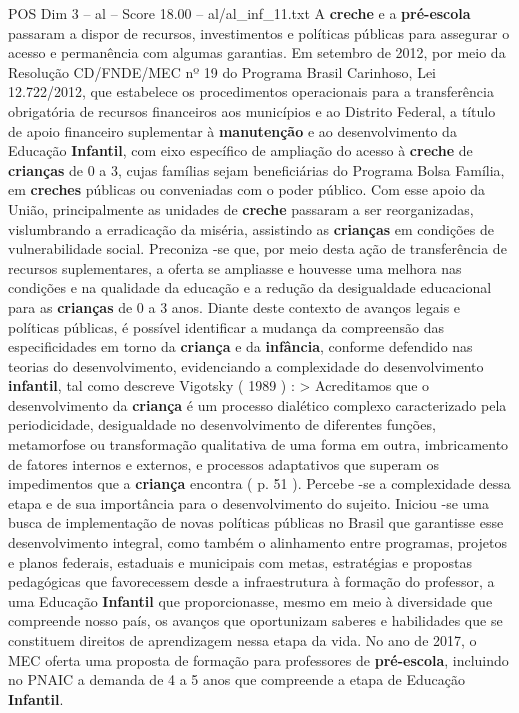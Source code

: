 \begin{textsample}{POS Dim 3 – al – Score 18.00 – al/al\_inf\_11.txt}
A \textbf{creche} e a \textbf{pré-escola} passaram a dispor de recursos, investimentos e políticas públicas para assegurar o acesso e permanência com algumas garantias.
Em setembro de 2012, por meio da Resolução CD/FNDE/MEC nº 19 do Programa Brasil Carinhoso, Lei 12.722/2012, que estabelece os procedimentos operacionais para a transferência obrigatória de recursos financeiros aos municípios e ao Distrito Federal, a título de apoio financeiro suplementar à \textbf{manutenção} e ao desenvolvimento da Educação \textbf{Infantil}, com eixo específico de ampliação do acesso à \textbf{creche} de \textbf{crianças} de 0 a 3, cujas famílias sejam beneficiárias do Programa Bolsa Família, em \textbf{creches} públicas ou conveniadas com o poder público.
Com esse apoio da União, principalmente as unidades de \textbf{creche} passaram a ser reorganizadas, vislumbrando a erradicação da miséria, assistindo as \textbf{crianças} em condições de vulnerabilidade social.
Preconiza -se que, por meio desta ação de transferência de recursos suplementares, a oferta se ampliasse e houvesse uma melhora nas condições e na qualidade da educação e a redução da desigualdade educacional para as \textbf{crianças} de 0 a 3 anos.
Diante deste contexto de avanços legais e políticas públicas, é possível identificar a mudança da compreensão das especificidades em torno da \textbf{criança} e da \textbf{infância}, conforme defendido nas teorias do desenvolvimento, evidenciando a complexidade do desenvolvimento \textbf{infantil}, tal como descreve Vigotsky ( 1989 ) : > Acreditamos que o desenvolvimento da \textbf{criança} é um processo dialético complexo caracterizado pela periodicidade, desigualdade no desenvolvimento de diferentes funções, metamorfose ou transformação qualitativa de uma forma em outra, imbricamento de fatores internos e externos, e processos adaptativos que superam os impedimentos que a \textbf{criança} encontra ( p. 51 ).
Percebe -se a complexidade dessa etapa e de sua importância para o desenvolvimento do sujeito.
Iniciou -se uma busca de implementação de novas políticas públicas no Brasil que garantisse esse desenvolvimento integral, como também o alinhamento entre programas, projetos e planos federais, estaduais e municipais com metas, estratégias e propostas pedagógicas que favorecessem desde a infraestrutura à formação do professor, a uma Educação \textbf{Infantil} que proporcionasse, mesmo em meio à diversidade que compreende nosso país, os avanços que oportunizam saberes e habilidades que se constituem direitos de aprendizagem nessa etapa da vida.
No ano de 2017, o MEC oferta uma proposta de formação para professores de \textbf{pré-escola}, incluindo no PNAIC a demanda de 4 a 5 anos que compreende a etapa de Educação \textbf{Infantil}.

\end{textsample}
